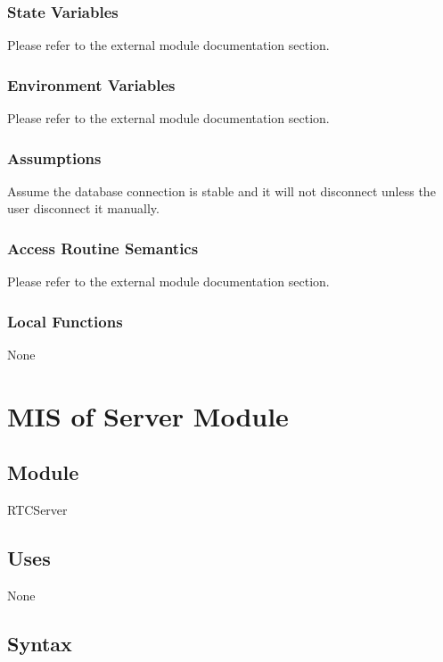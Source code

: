 \documentclass[12pt, titlepage]{article}
\begin{document}
\subsubsection{State Variables}

Please refer to the external module documentation section.

\subsubsection{Environment Variables}

Please refer to the external module documentation section.

\subsubsection{Assumptions}

Assume the database connection is stable and it will not disconnect unless the user disconnect it manually.

\subsubsection{Access Routine Semantics}

Please refer to the external module documentation section.

\subsubsection{Local Functions}

None

\newpage

\section{MIS of Server Module} \label{mServer}

\subsection{Module}

RTCServer

\subsection{Uses}

None

\subsection{Syntax}
\end{document}

